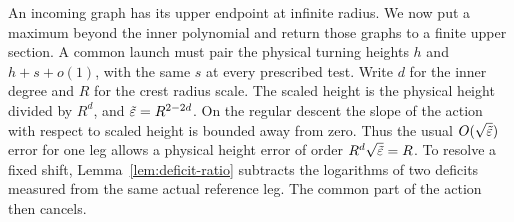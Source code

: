 An incoming graph has its upper endpoint at infinite radius. We now
put a maximum beyond the inner polynomial and return those graphs to a
finite upper section. A common launch must pair the physical turning
heights $h$ and $h+s+o(1)$, with the same $s$ at every prescribed test.
Write $d$ for the inner degree and $R$ for the crest radius scale. The
scaled height is the physical height divided by $R^d$, and
$\tilde{\varepsilon}=R^{2-2d}$. On the regular descent the slope of the
action with respect to scaled height is bounded away from zero.
Thus the usual $O(\sqrt{\tilde{\varepsilon}})$ error for one leg allows a
physical height error of order $R^d\sqrt{\tilde{\varepsilon}}=R$. To resolve a
fixed shift, Lemma~\ref{lem:deficit-ratio} subtracts the logarithms of
two deficits measured from the same actual reference leg. The common
part of the action then cancels.




